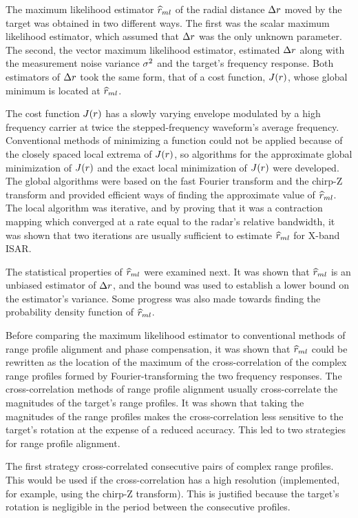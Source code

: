 The maximum likelihood estimator $\widehat{r}_{ml}$ of the radial distance ${\Delta r}$ moved 
by the target was obtained in two different ways.  The first was the scalar
maximum likelihood estimator, which assumed that ${\Delta r}$ was the only unknown
parameter.  The second, the vector maximum likelihood estimator, estimated  
${\Delta r}$ along with the measurement noise variance ${\sigma^2}$ and the target's 
frequency response.  Both estimators of ${\Delta r}$ took the same form, that of a
cost function, $J({r})$, whose global minimum is located at $\widehat{r}_{ml}$.

The cost function $J({r})$ has a slowly varying envelope modulated by a high
frequency carrier at twice the stepped-frequency waveform's average
frequency.  Conventional methods of minimizing a function could not be
applied because of the closely spaced local extrema of $J({r})$, so
algorithms for the approximate global minimization of $J({r})$ and the exact
local minimization of $J({r})$ were developed.  The global algorithms were
based on the fast Fourier transform and the chirp-Z transform and provided
efficient ways of finding the approximate value of $\widehat{r}_{ml}$.  The local
algorithm was iterative, and by proving that it was a contraction mapping
which converged at a rate equal to the radar's relative bandwidth, it was
shown that two iterations are usually sufficient to estimate $\widehat{r}_{ml}$ for 
X-band ISAR. 

The statistical properties of $\widehat{r}_{ml}$ were examined next.  It was shown that
$\widehat{r}_{ml}$ is an unbiased estimator of ${\Delta r}$, and the \CR bound was used to
establish a lower bound on the estimator's variance.  Some progress was also
made towards finding the probability density function of $\widehat{r}_{ml}$.

Before comparing the maximum likelihood estimator to conventional methods of
range profile alignment and phase compensation, it was shown that $\widehat{r}_{ml}$
could be rewritten as the location of the maximum of the cross-correlation of the complex 
range profiles formed by Fourier-transforming the two frequency responses.
The cross-correlation methods of range profile alignment usually
cross-correlate the magnitudes of the target's range profiles.  It was shown
that taking the magnitudes of the range profiles makes the cross-correlation
less sensitive to the target's rotation at the expense of a reduced
accuracy.  This led to two strategies for range profile alignment.  

The first strategy cross-correlated consecutive pairs of complex range 
profiles.  This would be used if the cross-correlation has a high 
resolution (implemented, for example, using the chirp-Z transform).  This is 
justified because the target's rotation is negligible in the period
between the consecutive profiles.

